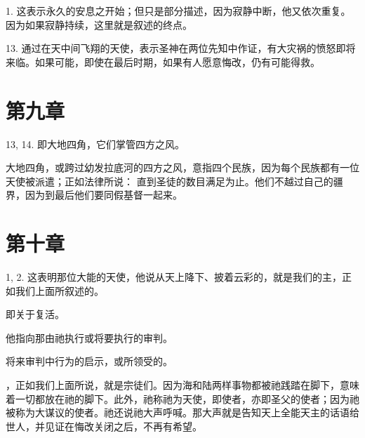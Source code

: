 1.  这表示永久的安息之开始；但只是部分描述，因为寂静中断，他又依次重复。因为如果寂静持续，这里就是叙述的终点。\par

13.  通过在天中间飞翔的天使，表示圣神在两位先知中作证，有大灾祸的愤怒即将来临。如果可能，即使在最后时期，如果有人愿意悔改，仍有可能得救。\par


\section{第九章}

13, 14.  即大地四角，它们掌管四方之风。\par

 大地四角，或跨过幼发拉底河的四方之风，意指四个民族，因为每个民族都有一位天使被派遣；正如法律所说： 直到圣徒的数目满足为止。他们不越过自己的疆界，因为到最后他们要同假基督一起来。\par


\section{第十章}

1, 2.  这表明那位大能的天使，他说从天上降下、披着云彩的，就是我们的主，正如我们上面所叙述的。\par

 即关于复活。\par

 他指向那由祂执行或将要执行的审判。\par

 将来审判中行为的启示，或所领受的。\par

，正如我们上面所说，就是宗徒们。因为海和陆两样事物都被祂践踏在脚下，意味着一切都放在祂的脚下。此外，祂称祂为天使，即使者，亦即圣父的使者；因为祂被称为大谋议的使者。祂还说祂大声呼喊。那大声就是告知天上全能天主的话语给世人，并见证在悔改关闭之后，不再有希望。\par

